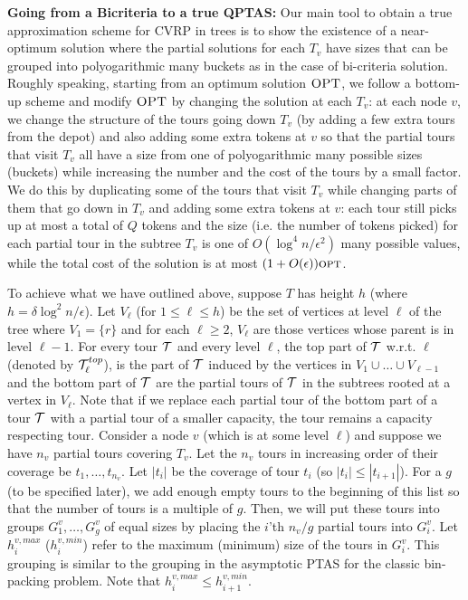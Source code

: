\documentclass[twoside,leqno]{article}
\newcommand{\calT}{{\cal T}}
\newcommand{\opt}{\mbox{\sc opt}}
\newcommand{\OPT}{\mbox{\sc OPT}}
\newcommand{\eps}{\epsilon}
\begin{document}
\textbf{Going from a Bicriteria to a true QPTAS:}
Our main tool to obtain a true approximation scheme for CVRP in trees is to show the existence of a near-optimum solution where
the partial solutions for each $T_v$ have sizes that can be grouped into polyogarithmic many buckets as in the case of bi-criteria solution. 
Roughly speaking, starting from an optimum solution $\OPT$, we follow a bottom-up scheme and modify $\OPT$ by changing the solution at each $T_v$: 
at each node $v$, we change the structure of the tours going down $T_v$ (by adding a few extra tours from the depot) and
also adding some extra tokens at $v$ so that the
partial tours that visit $T_v$ all have a size from one of polyogarithmic many possible sizes (buckets)
while increasing the number and the cost of the tours by a small factor. We do this by duplicating some of the tours
that visit $T_v$ while changing parts of them that go down in $T_v$ and adding some extra tokens at $v$:
each tour still picks up at most a total of $Q$ tokens and the size (i.e. the number of tokens picked)
for each partial tour in the subtree $T_v$ is one of $O(\log^4 n/\eps^2)$ many possible values, while the total cost
of the solution is at most $(1+O(\eps))\opt$.

To achieve what we have outlined above, suppose $T$ has height $h$ (where $h=\delta\log^2 n/\epsilon$). 
Let $V_\ell$ (for $1\leq \ell \leq h$) be the set of vertices at level
$\ell$ of the tree where $V_1=\{r\}$ and for each $\ell\geq 2$, $V_\ell$ are those vertices whose parent is in level $\ell-1$. For every tour $\calT$ and every level $\ell$, the top part of $\calT$ w.r.t. $\ell$ (denoted by $\calT_\ell^{top}$), is the part of $\calT$ induced by the vertices in $V_1\cup\ldots\cup V_{\ell-1}$ and the bottom part of $\calT$ are the partial tours of $\calT$ in the subtrees rooted at a vertex in $V_\ell$. Note that if we replace each partial tour of
the bottom part of a tour $\calT$ with a partial tour of a smaller capacity, the tour remains a capacity respecting tour.
Consider a node $v$ (which is at some level $\ell$) and suppose we have $n_v$ partial tours covering $T_v$. Let the $n_v$ tours in increasing order of their coverage be $t_{1}, \ldots, t_{n_v}$. Let $|t_i|$ be the coverage of tour $t_i$ (so $|t_i| \le |t_{i+1}|$). 
For a $g$ (to be specified later), we add enough empty tours to the beginning of this list so that the number of tours is a multiple of $g$. Then, we will put these tours into groups $G^v_{1}, \ldots, G^v_{g}$ of equal sizes by placing
the $i$'th $ n_v/g $ partial tours into $G^v_i$.
Let $h^{v,max}_i$ ($h^{v,min}_i$) refer to the maximum (minimum) size of the tours in $G^v_{i}$. This grouping is similar to the
grouping in the asymptotic PTAS for the classic bin-packing problem.
Note that $h^{v,max}_{i} \le h^{v,min}_{i+1}$. 
\end{document}
